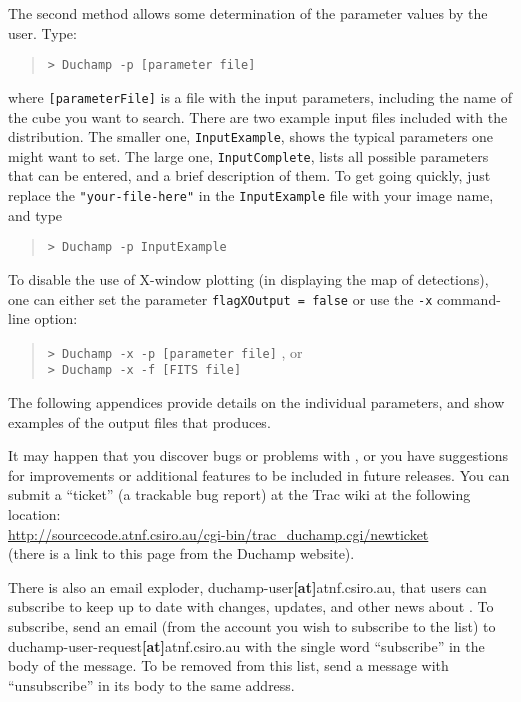 The second method allows some determination of the parameter values by
the user. Type:
\begin{quote}
{\footnotesize
\texttt{> Duchamp -p [parameter file]}
}
\end{quote}
where \texttt{[parameterFile]} is a file with the input parameters,
including the name of the cube you want to search. There are two
example input files included with the distribution. The smaller one,
\texttt{InputExample}, shows the typical parameters one might want to
set. The large one, \texttt{InputComplete}, lists all possible
parameters that can be entered, and a brief description of them. To
get going quickly, just replace the \texttt{"your-file-here"} in the
\texttt{InputExample} file with your image name, and type
\begin{quote}
{\footnotesize
\texttt{> Duchamp -p InputExample}
}
\end{quote}

To disable the use of X-window plotting (in displaying the map of
detections), one can either set the parameter \texttt{flagXOutput =
false} or use the \texttt{-x} command-line option:
\begin{quote}
{\footnotesize
\texttt{> Duchamp -x -p [parameter file]}
}, or\\
{\footnotesize
\texttt{> Duchamp -x -f [FITS file]}
}
\end{quote}

The following appendices provide details on the individual parameters,
and show examples of the output files that \duchamp produces.

It may happen that you discover bugs or problems with \duchamp, or you
have suggestions for improvements or additional features to be
included in future releases. You can submit a ``ticket'' (a trackable
bug report) at the \duchamp Trac wiki at the following location:\\
\href{http://sourcecode.atnf.csiro.au/cgi-bin/trac\_duchamp.cgi/newticket}%
{\footnotesize 
http://sourcecode.atnf.csiro.au/cgi-bin/trac\_duchamp.cgi/newticket}
\\(there is a link to this page from the Duchamp website).

There is also an email exploder, duchamp-user\textbf{[at]}atnf.csiro.au,
that users can subscribe to keep up to date with changes, updates, and
other news about \duchamp. To subscribe, send an email (from the
account you wish to subscribe to the list) to
duchamp-user-request\textbf{[at]}atnf.csiro.au with the single word
``subscribe'' in the body of the message. To be removed from this
list, send a message with ``unsubscribe'' in its body to the same
address.

